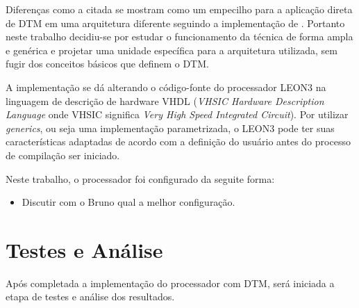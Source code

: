 Diferenças como a citada se mostram como um empecilho para a aplicação direta de DTM em uma arquitetura diferente seguindo a implementação de \cite{costa2001explorando}. Portanto neste trabalho decidiu-se por estudar o funcionamento da técnica de forma ampla e genérica e projetar uma unidade específica para a arquitetura utilizada, sem fugir dos conceitos básicos que definem o DTM.

A implementação se dá alterando o código-fonte do processador LEON3 na linguagem de descrição de hardware VHDL (\textit{VHSIC Hardware Description Language} onde VHSIC significa \textit{Very High Speed Integrated Circuit}). Por utilizar \textit{generics}, ou seja uma implementação parametrizada, o LEON3 pode ter suas características adaptadas de acordo com a definição do usuário antes do processo de compilação ser iniciado.

Neste trabalho, o processador foi configurado da seguite forma:


\begin{itemize}
	\item Discutir com o Bruno qual a melhor configuração.
\end{itemize}


\section{Testes e Análise}
\label{Metodologia:Analise}

Após completada a implementação do processador com DTM, será iniciada a etapa de testes e análise dos resultados. 


